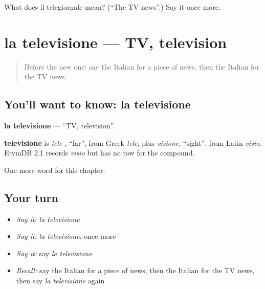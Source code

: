 \begin{tcolorbox}[breakable,colback=teal!4,colframe=teal!35!black,title={Before you move on}]
What does il telegiornale mean? (\textquotedblleft{}The TV news\textquotedblright{}.) Say it once more.
\end{tcolorbox}
\section[la televisione]{la televisione — TV, television}

\label{lesson:IT-C249-televisione}



\begin{quote}
Before the new one: say the Italian for a piece of news, then the Italian for the TV news.
\end{quote}

\subsection*{You'll want to know: la televisione}
\textbf{la televisione} — \textquotedblleft{}TV, television\textquotedblright{}.

\begin{cousinweb}
\textbf{televisione} is \emph{tele-}, \textquotedblleft{}far\textquotedblright{}, from Greek \emph{tele}, plus \emph{visione}, \textquotedblleft{}sight\textquotedblright{}, from Latin \emph{visio}. EtymDB 2.1 records \emph{visio} but has no row for the compound.
\end{cousinweb}

\begin{grammarlens}[title={What you've built}]
One more word for this chapter.
\end{grammarlens}

\subsection*{Your turn}
\begin{itemize}
\raggedright
  \item \emph{Say it:} \emph{la televisione}
  \item \emph{Say it:} \emph{la televisione}, once more
  \item \emph{Say it:} say \emph{la televisione}
  \item \emph{Recall:} say the Italian for a piece of news, then the Italian for the TV news, then say \emph{la televisione} again
\end{itemize}

